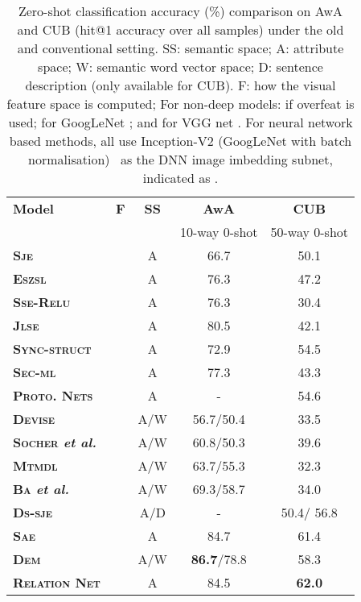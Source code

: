 \documentclass[10pt,twocolumn,letterpaper]{article}
\begin{document}
\setlength{\tabcolsep}{6pt}
\begin{table}[t]
\centering
\footnotesize
\begin{tabular}{@{} lcccc @{}}
\toprule

\textbf{Model} & \textbf{F}     & \textbf{SS}   & \textbf{AwA} & \textbf{CUB} \\ 
 &     &   & 10-way 0-shot & 50-way 0-shot \\ 
\midrule 

\textbf{\textsc{Sje}}~\cite{akata2015evaluation}& & A & 66.7 &50.1  \\
\textbf{\textsc{Eszsl}}~\cite{romera2015embarrassingly}& & A & 76.3 & 47.2 \\
\textbf{\textsc{Sse}-\textsc{Relu}}~\cite{zhang2015zero}& & A & 76.3 & 30.4 \\
\textbf{\textsc{Jlse}}~\cite{zhang2016zero}&  & A & 80.5 & 42.1 \\ 
\textbf{\textsc{Sync-struct}}~\cite{changpinyo2016synthesized}& & A & 72.9 & 54.5 \\ 
\textbf{\textsc{Sec-ml}}~\cite{bucher2016improving}&  & A & 77.3 & 43.3 \\  
\textbf{\textsc{Proto.} \textsc{Nets}}~\cite{snell2017prototypical}& & A & - & 54.6\\ 
\midrule
\textbf{\textsc{Devise}}~\cite{frome2013devise}& & A/W &56.7/50.4  &33.5   \\ 
\textbf{\textsc{Socher} {\em et al.}}~\cite{socher2013zero}& & A/W & 60.8/50.3 &39.6  \\ 
\textbf{\textsc{Mtmdl}}~\cite{yang2014unified}& & A/W &63.7/55.3   &32.3   \\ 
\textbf{\textsc{Ba} {\em et al.}}~\cite{lei2015predicting}& & A/W &69.3/58.7  &34.0   \\ 
\textbf{\textsc{Ds-sje}}~\cite{reed2016learning}& & A/D & - & 50.4/ 56.8  \\ 
\textbf{\textsc{Sae}}~\cite{kodirov2017semantic}& & A & 84.7 & 61.4 \\
\textbf{\textsc{Dem}}~\cite{zhang2017learning}& & A/W & \textbf{86.7}/78.8 & 58.3 \\ 
\midrule
\textbf{\textsc{Relation} \textsc{Net}}& & A & 84.5 &\textbf{62.0}\\ 
\bottomrule
\end{tabular}
\caption{\footnotesize Zero-shot classification accuracy (\%) comparison on AwA and CUB (hit@1 accuracy over all samples) under the old and conventional setting. SS: semantic space; A: attribute space; W: semantic word vector space; D: sentence description (only available for CUB). F: how the visual feature space is computed; For non-deep models:  if overfeat \cite{sermanet2013overfeat} is used;  for GoogLeNet \cite{szegedy2015going}; and  for VGG net \cite{simonyan2014very}. For neural network based methods, all use Inception-V2 (GoogLeNet with batch normalisation)~\cite{szegedy2015going, ioffe2015batch} as the DNN image imbedding subnet, indicated as .}
\label{tab:zsl}
\end{table}
\end{document}
